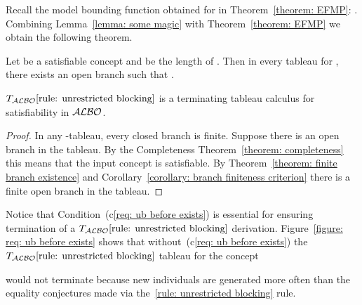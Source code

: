 \documentclass[leqno
,pdflatex
,prodmode
,acmtocl
]{acmsmall}
\newcommand{\mathcmd}[1]{\ensuremath{#1}\xspace}
\newcommand{\dlfont}{\mathcal}
\newcommand{\dl}[1]{\mathcmd{\dlfont{#1}}}
\newcommand{\ALBOid}{\dl{ALBO\smash[t]{\mbox{}}}}
\newcommand{\TALBOidub}{\mathcmd{T_\ALBOid\eqref{rule: unrestricted blocking}}}
\begin{document}
Recall the model bounding function  obtained 
for  in Theorem~\ref{theorem: EFMP}: .
Combining Lemma~\ref{lemma: some magic} with Theorem~\ref{theorem: EFMP} we obtain the following theorem.
\begin{theorem}\label{theorem: finite branch existence}
Let  be a satisfiable concept and  be the length of . Then
in every  tableau for ,
there exists an open branch 
such that .
\end{theorem}

\begin{theorem}[Termination]
 \TALBOidub is a terminating tableau calculus for satisfiability in \ALBOid.
\end{theorem}
\begin{proof}
In any -tableau, every closed branch is
finite.
Suppose there is an open branch in the tableau.
By the Completeness Theorem~\ref{theorem: completeness} this means that the input concept is satisfiable.
By Theorem~\ref{theorem: finite branch existence} and Corollary~\ref{corollary: branch finiteness criterion}
there is a finite open branch in the tableau.
\end{proof}

Notice that
Condition~(c\ref{req: ub before exists}) is essential for ensuring termination
of a \TALBOidub derivation.
Figure~\ref{figure: req: ub before exists}
shows that 
without~(c\ref{req: ub before exists}) the 
\TALBOidub tableau for the concept 

would not terminate because
new individuals are generated more often than the equality conjectures
made via the~\eqref{rule: unrestricted blocking}
rule.
\end{document}
